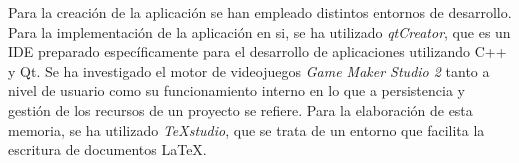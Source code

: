 Para la creación de la aplicación se han empleado distintos entornos de desarrollo.
Para la implementación de la aplicación en si, se ha utilizado \textit{qtCreator}, que es un IDE preparado específicamente para el desarrollo de aplicaciones utilizando C++ y Qt.
Se ha investigado el motor de videojuegos \textit{Game Maker Studio 2}\cite{gamemaker} tanto a nivel de usuario como su funcionamiento interno en lo que a persistencia y gestión de los recursos de un proyecto se refiere.
Para la elaboración de esta memoria, se ha utilizado \textit{TeXstudio}\cite{texstudio}, que se trata de un entorno que facilita la escritura de documentos LaTeX.